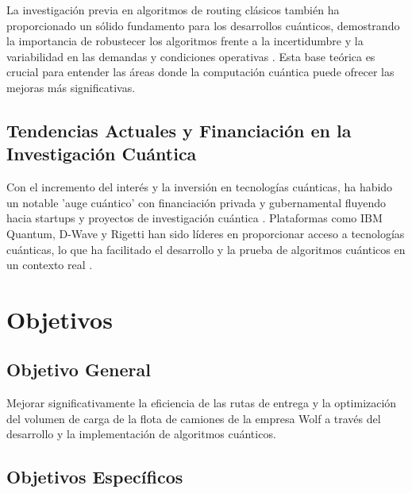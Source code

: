 \documentclass[11pt,a4paper,spanish]{book}
\begin{document}
La investigación previa en algoritmos de routing clásicos también ha proporcionado un sólido fundamento para los desarrollos cuánticos, demostrando la importancia de robustecer los algoritmos frente a la incertidumbre y la variabilidad en las demandas y condiciones operativas \citep{transportationScience}. Esta base teórica es crucial para entender las áreas donde la computación cuántica puede ofrecer las mejoras más significativas.

\section{Tendencias Actuales y Financiación en la Investigación Cuántica}

Con el incremento del interés y la inversión en tecnologías cuánticas, ha habido un notable 'auge cuántico' con financiación privada y gubernamental fluyendo hacia startups y proyectos de investigación cuántica \citep{quantumTech}. Plataformas como IBM Quantum, D-Wave y Rigetti han sido líderes en proporcionar acceso a tecnologías cuánticas, lo que ha facilitado el desarrollo y la prueba de algoritmos cuánticos en un contexto real \citep{qiskit, dwaveOcean}.

\chapter{Objetivos}

\section{Objetivo General}
Mejorar significativamente la eficiencia de las rutas de entrega y la optimización del volumen de carga de la flota de camiones de la empresa Wolf a través del desarrollo y la implementación de algoritmos cuánticos.

\section{Objetivos Específicos}
\end{document}
